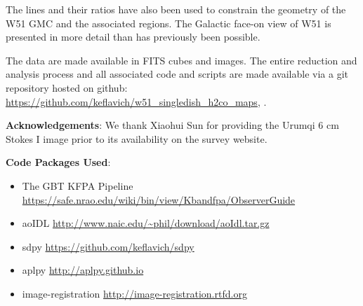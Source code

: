 The \formaldehyde lines and their ratios have also been used to constrain the
geometry of the W51 GMC and the associated \hii regions.  The Galactic face-on
view of W51 is presented in more detail than has previously been possible.

The data are made available in FITS cubes and images.  The entire reduction and
analysis process and all associated code and scripts are made available via a
git repository hosted on github:
\url{https://github.com/keflavich/w51_singledish_h2co_maps}, .



 
% 
% 

\textbf{Acknowledgements}:
We thank Xiaohui Sun for providing the Urumqi 6 cm Stokes I image prior to its
availability on the survey website.

\textbf{Code Packages Used}:

\begin{itemize}
    \item The GBT KFPA Pipeline \url{https://safe.nrao.edu/wiki/bin/view/Kbandfpa/ObserverGuide}
    \item aoIDL \url{http://www.naic.edu/~phil/download/aoIdl.tar.gz}
    \item sdpy \url{https://github.com/keflavich/sdpy}
    \item aplpy \url{http://aplpy.github.io}
    \item image-registration \url{http://image-registration.rtfd.org}
\end{itemize}

